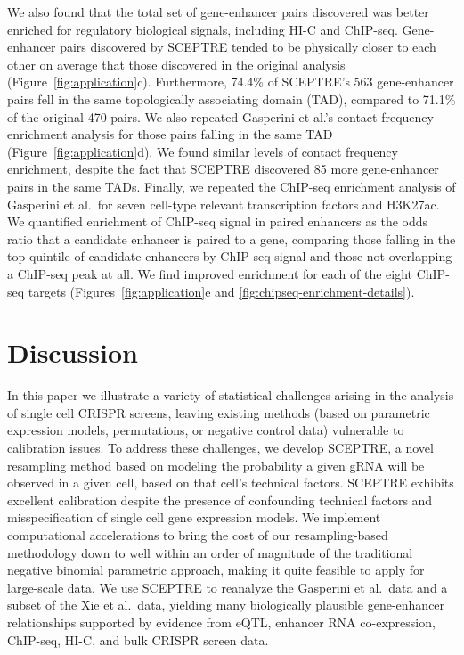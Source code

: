 \documentclass{nature}
\begin{document}
We also found that the total set of gene-enhancer pairs discovered was better enriched for regulatory biological signals, including HI-C and ChIP-seq. Gene-enhancer pairs discovered by SCEPTRE tended to be physically closer to each other on average that those discovered in the original analysis (Figure~\ref{fig:application}c). Furthermore, 74.4\% of SCEPTRE's 563 gene-enhancer pairs fell in the same topologically associating domain (TAD), compared to 71.1\% of the original 470 pairs. We also repeated Gasperini et al.'s contact frequency enrichment analysis for those pairs falling in the same TAD (Figure~\ref{fig:application}d). We found similar levels of contact frequency enrichment, despite the fact that SCEPTRE discovered 85 more gene-enhancer pairs in the same TADs. Finally, we repeated the ChIP-seq enrichment analysis of Gasperini et al.\ for seven cell-type relevant transcription factors and H3K27ac. We quantified enrichment of ChIP-seq signal in paired enhancers as the odds ratio that a candidate enhancer is paired to a gene, comparing those falling in the top quintile of candidate enhancers by ChIP-seq signal and those not overlapping a ChIP-seq peak at all. We find improved enrichment for each of the eight ChIP-seq targets (Figures~\ref{fig:application}e and \ref{fig:chipseq-enrichment-details}).


\section*{Discussion}

In this paper we illustrate a variety of statistical challenges arising in the analysis of single cell CRISPR screens, leaving existing methods (based on parametric expression models, permutations, or negative control data) vulnerable to calibration issues. To address these challenges, we develop SCEPTRE, a novel resampling method based on modeling the probability a given gRNA will be observed in a given cell, based on that cell's technical factors. SCEPTRE exhibits excellent calibration despite the presence of confounding technical factors and misspecification of single cell gene expression models. We implement computational accelerations to bring the cost of our resampling-based methodology down to well within an order of magnitude of the traditional negative binomial parametric approach, making it quite feasible to apply for large-scale data. We use SCEPTRE to reanalyze the Gasperini et al.\ data and a subset of the Xie et al.\ data, yielding many biologically plausible gene-enhancer relationships supported by evidence from eQTL, enhancer RNA co-expression, ChIP-seq, HI-C, and bulk CRISPR screen data. 
\end{document}
